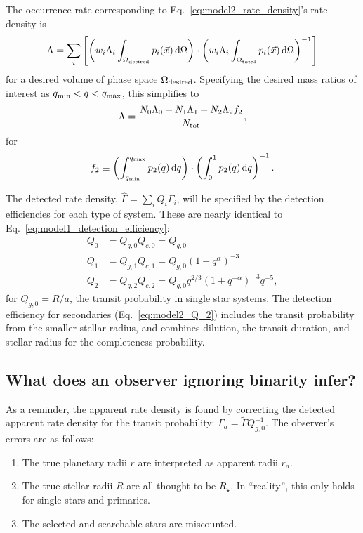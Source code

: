 The occurrence rate corresponding to Eq.~\ref{eq:model2_rate_density}'s rate 
density is
\begin{equation}
\Lambda = \sum_i
\left[
\left(
    w_i \Lambda_i \int_{\Omega_{\rm desired}} p_i(\vec{x}) \,{\rm d}\Omega
\right)
\cdot
\left(
    w_i \Lambda_i \int_{\Omega_{\rm total}} p_i(\vec{x}) \,{\rm d}\Omega
\right)^{-1}
\right]
\end{equation}
for a desired volume of phase space $\Omega_{\rm desired}$.
Specifying the desired mass ratios of interest as $q_{\rm min} < q < q_{\rm 
max}$, this simplifies to
\begin{equation}
\Lambda = 
\frac{N_0 \Lambda_0 + N_1 \Lambda_1 + N_2 \Lambda_2 f_2}
{N_{\rm tot}},
\end{equation}
for
\begin{equation}
f_2 \equiv
\left(
\int_{q_{\rm min}}^{q_{\rm max}} p_2(q) \,{\rm d}q
\right)
\cdot
\left(
\int_{0}^{1} p_2(q) \,{\rm d}q
\right)^{-1}.
\end{equation}

The detected rate density, $\hat{\Gamma} = \sum_i Q_i \Gamma_i$, will be 
specified by the detection efficiencies for each type of system.
These are nearly identical to Eq.~\ref{eq:model1_detection_efficiency}:
\begin{align}
Q_0 &= Q_{g,0}Q_{c,0} = Q_{g,0} \label{eq:model2_Q_0}\\
Q_1 &= Q_{g,1}Q_{c,1} = Q_{g,0} (1+q^\alpha)^{-3} \\
Q_2 &= Q_{g,2}Q_{c,2} = Q_{g,0} q^{2/3} (1+q^{-\alpha})^{-3} q^{-5}, 
\label{eq:model2_Q_2}
\end{align}
for $Q_{g,0}=R/a$, the transit probability in single star systems.
The detection efficiency for secondaries (Eq.~\ref{eq:model2_Q_2}) includes 
the transit probability from the smaller stellar radius, and combines 
dilution, the transit duration, and stellar radius for the completeness
probability.

\subsection{What does an observer ignoring binarity infer?}

As a reminder, the apparent rate density is found by correcting the detected 
apparent rate density for the transit probability:
$\Gamma_a = \tilde{\Gamma} Q_{g,0}^{-1}$.
The observer's errors are as follows:
\begin{enumerate}
    \item The true planetary radii $r$ are interpreted as apparent radii $r_a$.
    \item The true stellar radii $R$ are all thought to be $R_\star$. In 
    ``reality'', this only holds for single stars and primaries.
    \item The selected and searchable stars are miscounted.
\end{enumerate}

